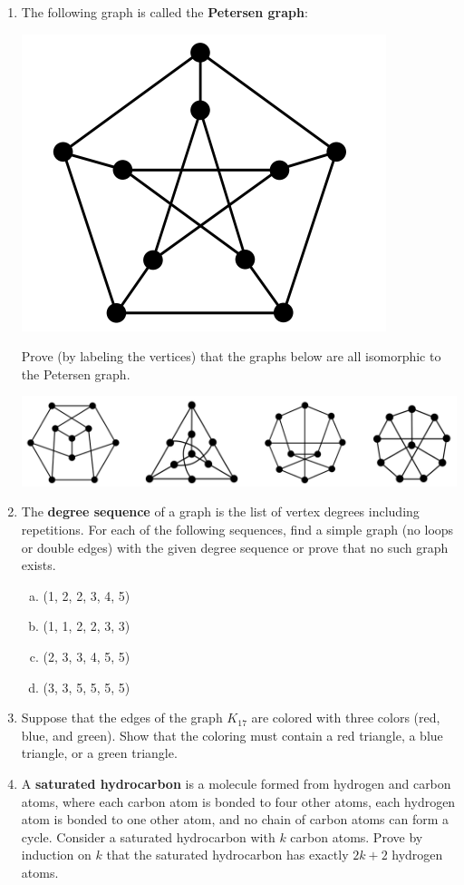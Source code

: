 \documentclass{article}
\begin{document}
\begin{enumerate}

\item The following graph is called the {\bf Petersen graph}:
	\begin{center}
		\includegraphics[width=.25\textwidth]{petersen.png}
	\end{center}
Prove (by labeling the vertices) that the graphs below are all isomorphic to the Petersen
graph.
	\begin{center}
		\includegraphics[width=.8\textwidth]{graphs.png}
	\end{center}

\item The \textbf{degree sequence} of a graph is the list of vertex degrees including repetitions.
For each of the following sequences, find a simple graph (no loops or double edges) with
the given degree sequence or prove that no such graph exists.
\begin{enumerate}[(a)]
	\item (1, 2, 2, 3, 4, 5)
	\item (1, 1, 2, 2, 3, 3)
	\item (2, 3, 3, 4, 5, 5)
	\item (3, 3, 5, 5, 5, 5)
\end{enumerate}


\item Suppose that the edges of the graph $K_{17}$ are colored with three colors (red, blue, and
green). Show that the coloring must contain a red triangle, a blue triangle, or a green
triangle.

\item A \textbf{saturated hydrocarbon} is a molecule formed from hydrogen and carbon atoms,
where each carbon atom is bonded to four other atoms, each hydrogen atom is bonded
to one other atom, and no chain of carbon atoms can form a cycle. Consider a saturated
hydrocarbon with $k$ carbon atoms. Prove by induction on $k$ that the saturated
hydrocarbon has exactly $2k + 2$ hydrogen atoms.


\end{enumerate}
\end{document}
